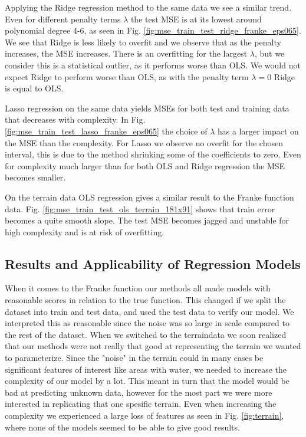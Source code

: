 \documentclass[%
 reprint,
nofootinbib,
 amsmath,amssymb,
 aps,
]{revtex4-2}
\begin{document}
Applying the Ridge regression method to the same data we see a similar trend. Even for different penalty terms $\lambda$ the test MSE is at its lowest around polynomial degree 4-6, as seen in Fig. \ref{fig:mse_train_test_ridge_franke_eps065}. We see that Ridge is less likely to overfit and we observe that as the penalty increases, the MSE increases. There is an overfitting for the largest $\lambda$, but we consider this is a statistical outlier, as it performs worse than OLS. We would not expect Ridge to perform worse than OLS, as with the penalty term $\lambda = 0$ Ridge is equal to OLS.

Lasso regression on the same data yields MSEs for both test and training data that decreases with complexity. In Fig. \ref{fig:mse_train_test_lasso_franke_eps065} the choice of $\lambda$ has a larger impact on the MSE than the complexity. For Lasso we observe no overfit for the chosen interval, this is due to the method shrinking some of the coefficients to zero. Even for complexity much larger than for both OLS and Ridge regression the MSE becomes smaller.

On the terrain data OLS regression gives a similar result to the Franke function data. Fig. \ref{fig:mse_train_test_ols_terrain_181x91} shows that train error becomes a quite smooth slope. The test MSE becomes jagged and unstable for high complexity and is at risk of overfitting.


\subsection{Results and Applicability of Regression Models}

When it comes to the Franke function our methods all made models with reasonable scores in relation to the true function. This changed if we split the dataset into train and test data, and used the test data to verify our model. We interpreted this as reasonable since the noise was so large in scale compared to the rest of the dataset. When we switched to the terraindata we soon realized that our methods were not really that good at representing the terrain we wanted to parameterize. Since the "noise" in the terrain could in many cases be significant features of interest like areas with water, we needed to increase the complexity of our model by a lot. This meant in turn that the model would be bad at predicting unknown data, however for the most part we were more interested in replicating that one spesific terrain. Even when increasing the complexity we experienced a large loss of features as seen in Fig. \ref{fig:terrain}, where none of the models seemed to be able to give good results.
\end{document}
